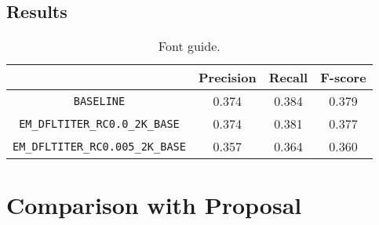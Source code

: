 \documentclass[11pt,letterpaper]{article}
\begin{document}
\subsection{Results}
\begin{table*}[t]
\begin{center}
\begin{tabular}{|c|c|c|c|}
\hline \bf  & \bf Precision & \bf Recall & \bf F-score \\ \hline
\texttt{BASELINE} & 0.374 & 0.384 & 0.379 \\
\hline
\hline
\texttt{EM\_DFLTITER\_RC0.0\_2K\_BASE} & 0.374 & 0.381 & 0.377 \\
\texttt{EM\_DFLTITER\_RC0.005\_2K\_BASE} & 0.357 & 0.364 & 0.360 \\
\hline
\end{tabular}
\end{center}
\caption{\label{font-table} Font guide. }
\end{table*}

\section{Comparison with Proposal}


\end{document}
